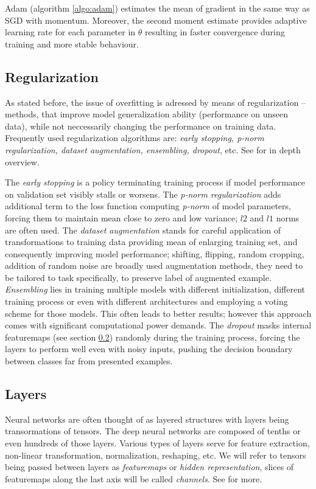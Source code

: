 Adam (algorithm \ref{algo:adam}) estimates the mean of gradient in the same way as SGD with momentum. Moreover, the second moment estimate provides adaptive learning rate for each parameter in $\theta$ resulting in faster convergence during training and more stable behaviour.

\subsection{Regularization}
\label{sec:regularization}

As stated before, the issue of overfitting is adressed by means of regularization -- methods, that improve model generalization ability (performance on unseen data), while not neccessarily changing the performance on training data. Frequently used regularization algorithms are: \emph{early stopping, p-norm regularization, dataset augmentation, ensembling, dropout}, etc. See \cite{Goodfellow-et-al-2016} for in depth overview.

The \emph{early stopping} is a policy terminating training process if model performance on validation set visibly stalls or worsens. The \emph{p-norm regularization} adds additional term to the loss function computing \emph{p-norm} of model parameters, forcing them to maintain mean close to zero and low variance; $l2$ and $l1$ norms are often used. The \emph{dataset augmentation} stands for careful application of transformations to training data providing mean of enlarging training set, and consequently improving model performance; shifting, flipping, random cropping, addition of random noise are broadly used augmentation methods, they need to be tailored to task specifically, to preserve label of augmented example. \emph{Ensembling} lies in training multiple models with different initialization, different training process or even with different architectures and employing a voting scheme for those models. This often leads to better results; however this approach comes with significant computational power demands. The \emph{dropout} masks internal featuremaps (see section \ref{sec:layers}) randomly during the training process, forcing the layers to perform well even with noisy inputs, pushing the decision boundary between classes far from presented examples.

\subsection{Layers}
\label{sec:layers}
Neural networks are often thought of as layered structures with layers being transormations of tensors. The deep neural networks are composed of tenths or even hundreds of those layers. Various types of layers serve for feature extraction, non-linear transformation, normalization, reshaping, etc. We will refer to tensors being passed between layers as \emph{featuremaps} or \emph{hidden representation}, slices of featuremaps along the last axis will be called \emph{channels}. See \cite{Goodfellow-et-al-2016} for more.

